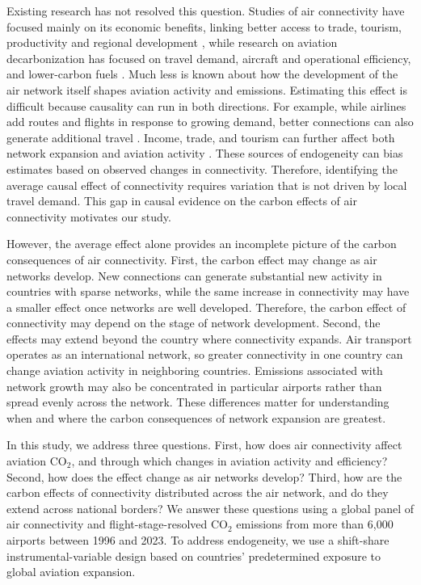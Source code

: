 \documentclass[12pt]{article}
\begin{document}
Existing research has not resolved this question. Studies of air
connectivity have focused mainly on its economic benefits, linking better
access to trade, tourism, productivity and regional development
\citep{lenaerts2021,zhang2020}, while research on aviation
decarbonization has focused on travel demand, aircraft and operational
efficiency, and lower-carbon fuels \citep{bergero2023,dray2022}. Much
less is known about how the development of the air network itself shapes
aviation activity and emissions. Estimating this effect is difficult
because causality can run in both directions. For example, while airlines
add routes and flights in response to growing demand, better connections
can also generate additional travel \citep{koo2017,pitfield2010}. Income,
trade, and tourism can further affect both network expansion and aviation
activity \citep{vandevijver2014}. These sources of endogeneity can bias
estimates based on observed changes in connectivity. Therefore,
identifying the average causal effect of connectivity requires variation
that is not driven by local travel demand. This gap in causal evidence on
the carbon effects of air connectivity motivates our study.

However, the average effect alone provides an incomplete picture of the
carbon consequences of air connectivity. First, the carbon effect may
change as air networks develop. New connections can generate substantial
new activity in countries with sparse networks, while the same increase in
connectivity may have a smaller effect once networks are well developed.
Therefore, the carbon effect of connectivity may depend on the stage of
network development. Second, the effects may extend beyond the country
where connectivity expands. Air transport operates as an international
network, so greater connectivity in one country can change aviation
activity in neighboring countries. Emissions associated with network
growth may also be concentrated in particular airports rather than spread
evenly across the network. These differences matter for understanding
when and where the carbon consequences of network expansion are greatest.

In this study, we address three questions. First, how does air
connectivity affect aviation CO$_2$, and through which changes in
aviation activity and efficiency? Second, how does the effect change as
air networks develop? Third, how are the carbon effects of connectivity
distributed across the air network, and do they extend across national
borders? We answer these questions using a global panel of air
connectivity and flight-stage-resolved CO$_2$ emissions from more than
6{,}000 airports between 1996 and 2023. To address endogeneity, we use a
shift-share instrumental-variable design based on countries'
predetermined exposure to global aviation expansion.
\end{document}
